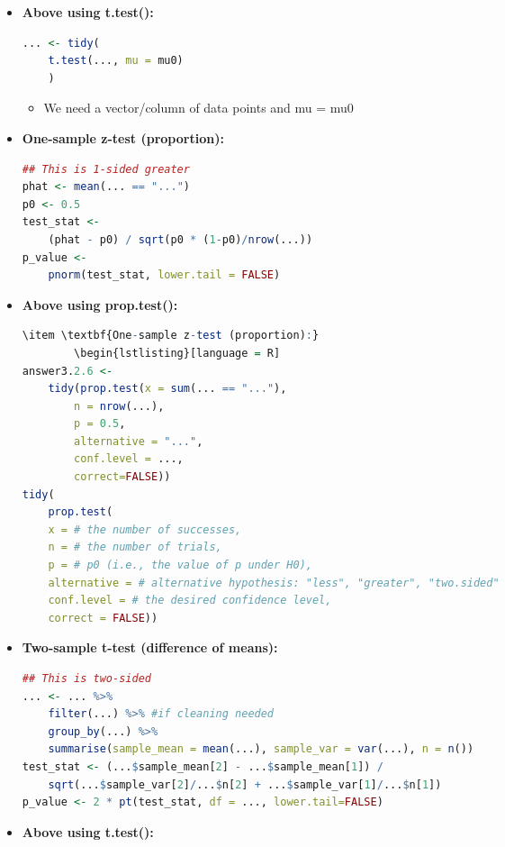 \documentclass[8pt,landscape,a4paper, fleqn, dvipsnames]{extarticle}
\begin{document}
\begin{multicols*}{4}
\begin{itemize}
\begin{itemize}
\begin{lstlisting}[language = R]
        \end{lstlisting}
    \item \textbf{Above using t.test():}
        \begin{lstlisting}[language = R]
... <- tidy(
    t.test(..., mu = mu0)
    )
        \end{lstlisting}
        \begin{itemize}
            \item We need a vector/column of data points and mu = mu0
        \end{itemize}
        \item \textbf{One-sample z-test (proportion):}
        \begin{lstlisting}[language = R]
## This is 1-sided greater
phat <- mean(... == "...")
p0 <- 0.5
test_stat <- 
    (phat - p0) / sqrt(p0 * (1-p0)/nrow(...))
p_value <- 
    pnorm(test_stat, lower.tail = FALSE)
        \end{lstlisting}
        \item \textbf{Above using prop.test():}
        \begin{lstlisting}[language = R]
\item \textbf{One-sample z-test (proportion):}
        \begin{lstlisting}[language = R]
answer3.2.6 <- 
    tidy(prop.test(x = sum(... == "..."), 
        n = nrow(...), 
        p = 0.5, 
        alternative = "...", 
        conf.level = ...,
        correct=FALSE))
tidy(
    prop.test(
    x = # the number of successes,
    n = # the number of trials, 
    p = # p0 (i.e., the value of p under H0),
    alternative = # alternative hypothesis: "less", "greater", "two.sided"
    conf.level = # the desired confidence level,
    correct = FALSE))
        \end{lstlisting}
        \item \textbf{Two-sample t-test (difference of means):}
        \begin{lstlisting}[language = R]
## This is two-sided
... <- ... %>% 
    filter(...) %>% #if cleaning needed
    group_by(...) %>% 
    summarise(sample_mean = mean(...), sample_var = var(...), n = n())
test_stat <- (...$sample_mean[2] - ...$sample_mean[1]) / 
    sqrt(...$sample_var[2]/...$n[2] + ...$sample_var[1]/...$n[1])
p_value <- 2 * pt(test_stat, df = ..., lower.tail=FALSE)
        \end{lstlisting}
        \item \textbf{Above using t.test():}
        \begin{lstlisting}[language = R]

\end{lstlisting}
\end{itemize}
\end{itemize}
\end{multicols*}
\end{document}
